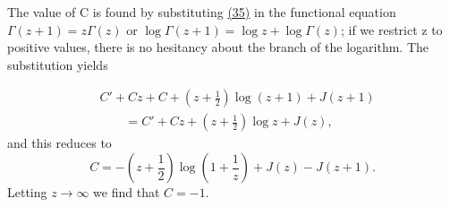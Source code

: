 The value of C is found by substituting \hyperref[eq:5.35]{(35)} in the functional equation $\Gamma(z+1)=z\Gamma(z)$ or $\log\Gamma(z+1)=\log z+\log\Gamma(z)$; if we restrict z to positive values, there is no hesitancy about the branch of the logarithm. The substitution yields


\begin{equation*}
\begin{aligned}
&C'+Cz+C+(z+\tfrac12)\log(z+1)+J(z+1)\\
&\qquad=C'+Cz+(z+\tfrac12)\log z+J(z),
\end{aligned}
\end{equation*}
and this reduces to
\begin{equation*}
C = - \left(z + \frac {1}{2}\right) \log \left(1 + \frac {1}{z}\right) + J (z) - J (z + 1).
\end{equation*}
Letting $z \to \infty$ we find that $C = -1$.

